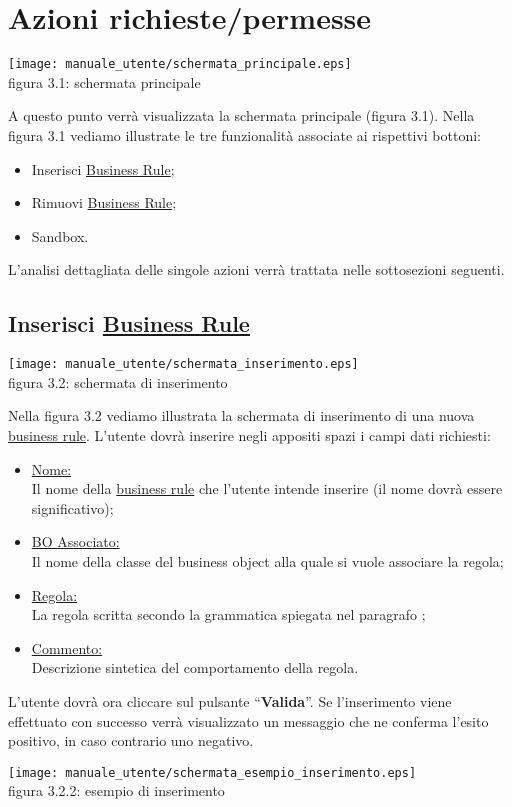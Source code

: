 \section{Azioni richieste/permesse}
\begin{center}
\texttt{[image: manuale\_utente/schermata\_principale.eps]}\\
 figura 3.1: schermata principale
\end{center}
A questo punto verr\`a visualizzata la schermata principale (figura 3.1).
Nella figura 3.1 vediamo illustrate le tre funzionalit\`a associate ai rispettivi bottoni:
\begin{itemize}
\item Inserisci \underline{Business Rule};
\item Rimuovi \underline{Business Rule};
\item Sandbox.
\end{itemize}
L'analisi dettagliata delle singole azioni verr\`a trattata nelle sottosezioni seguenti.
\subsection{Inserisci \underline{Business Rule}}
\begin{center}
\texttt{[image: manuale\_utente/schermata\_inserimento.eps]}\\
 figura 3.2: schermata di inserimento
\end{center}
Nella figura 3.2 vediamo illustrata la schermata di inserimento di una nuova \underline{business rule}. L'utente dovr\`a inserire negli appositi spazi i campi dati richiesti:
\begin{itemize}
\item \underline{Nome:} \\
Il nome della \underline{business rule} che l'utente intende inserire (il nome dovr\`a essere significativo);
\item \underline{BO Associato:} \\
Il nome della classe del business object alla quale si vuole associare la regola;
\item \underline{Regola:} \\
 La regola scritta secondo la grammatica spiegata nel paragrafo \Grammatica;
\item \underline{Commento:} \\
Descrizione sintetica del comportamento della regola. 
\end{itemize}
L'utente dovr\`a ora cliccare sul pulsante ``\textbf{Valida}''. Se l'inserimento viene effettuato con successo verr\`a visualizzato un messaggio che ne conferma l'esito positivo, in caso contrario uno negativo. 
\begin{center}
\texttt{[image: manuale\_utente/schermata\_esempio\_inserimento.eps]}\\
 figura 3.2.2: esempio di inserimento
\end{center} 
